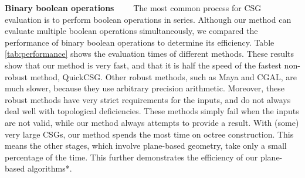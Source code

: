 \vspace{0.5em}
\noindent\textbf{Binary boolean operations}~~~~
The most common process for CSG evaluation is to perform boolean operations in series. Although our method can evaluate multiple boolean operations simultaneously, we compared the performance of binary boolean operations to determine its efficiency. Table \ref{tab:performance} shows the evaluation times of different methods. These results show that  our method is very fast, and that it is half the speed of the fastest non-robust method, QuickCSG. Other robust methods, such as Maya and CGAL, are much slower, because they use arbitrary precision arithmetic. Moreover, these robust methods have very strict requirements for the inputs, and do not always deal well with topological deficiencies. These methods simply fail when the inputs are not valid, while our method always attempts to provide a result. With (some) very large CSGs, our method spends the most time on octree construction. This means the other stages, which involve plane-based geometry, take only a small percentage of the time. This further demonstrates the efficiency of our plane-based algorithms*.

